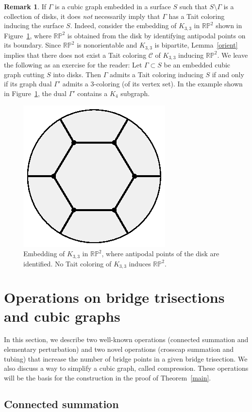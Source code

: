 \documentclass[11pt, oneside]{amsart}
\theoremstyle{theorem}
\theoremstyle{definition}
\newtheorem{remark}[theorem]{Remark}
\newcommand{\RP}{\mathbb{RP}}
\theoremstyle{theorem}
\begin{document}
\begin{remark}
If $\Gamma$ is a cubic graph embedded in a surface $S$ such that $S \setminus \Gamma$ is a collection of disks, it does \emph{not} necessarily imply that $\Gamma$ has a Tait coloring inducing the surface $S$.  Indeed, consider the embedding of $K_{3,3}$ in $\RP^2$ shown in Figure~\ref{K3RP}, where $\RP^2$ is obtained from the disk by identifying antipodal points on its boundary.  Since $\RP^2$ is nonorientable and $K_{3,3}$ is bipartite, Lemma~\ref{orient} implies that there does not exist a Tait coloring $\mathcal{C}$ of $K_{3,3}$ inducing $\RP^2$.  We leave the following as an exercise for the reader:  Let $\Gamma \subset S$ be an embedded cubic graph cutting $S$ into disks.  Then $\Gamma$ admits a Tait coloring inducing $S$ if and only if its graph dual $\Gamma'$ admits a 3-coloring (of its vertex set).  In the example shown in Figure~\ref{K3RP}, the dual $\Gamma'$ contains a $K_4$ subgraph.
\end{remark}

\begin{figure}[h!]
  \centering
  \includegraphics[width=.25\linewidth]{rp2.eps}
  \caption{Embedding of $K_{3,3}$ in $\RP^2$, where antipodal points of the disk are identified.  No Tait coloring of $K_{3,3}$ induces $\RP^2$.}
\label{K3RP}
\end{figure}


\section{Operations on bridge trisections and cubic graphs}\label{ops}

In this section, we describe two well-known operations (connected summation and elementary perturbation) and two novel operations (crosscap summation and tubing) that increase the number of bridge points in a given bridge trisection.  We also discuss a way to simplify a cubic graph, called compression.  These operations will be the basis for the construction in the proof of Theorem~\ref{main}.

\subsection{Connected summation}
\end{document}

